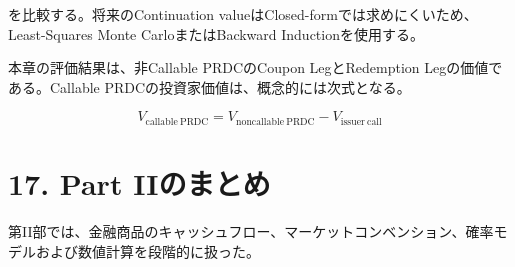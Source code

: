 \documentclass[
  letterpaper,
  DIV=11,
  numbers=noendperiod]{scrreprt}
\begin{document}
を比較する。将来のContinuation
valueはClosed-formでは求めにくいため、Least-Squares Monte
CarloまたはBackward Inductionを使用する。

本章の評価結果は、非Callable PRDCのCoupon LegとRedemption
Legの価値である。Callable PRDCの投資家価値は、概念的には次式となる。

\[
V_{\mathrm{callable\ PRDC}}
=
V_{\mathrm{noncallable\ PRDC}}
-
V_{\mathrm{issuer\ call}}
\]

\section{17. Part IIのまとめ}\label{part-iiux306eux307eux3068ux3081}

第II部では、金融商品のキャッシュフロー、マーケットコンベンション、確率モデルおよび数値計算を段階的に扱った。
\end{document}
